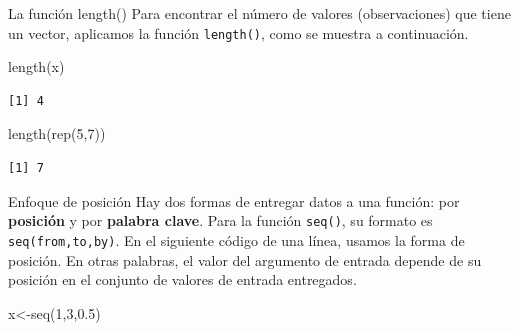 \documentclass[
  ignorenonframetext,
  aspectratio=169,
  spanish,
]{beamer}
\newenvironment{Shaded}{\begin{snugshade}}{\end{snugshade}}
\newcommand{\DecValTok}[1]{\textcolor[rgb]{0.68,0.00,0.00}{#1}}
\newcommand{\FloatTok}[1]{\textcolor[rgb]{0.68,0.00,0.00}{#1}}
\newcommand{\FunctionTok}[1]{\textcolor[rgb]{0.28,0.35,0.67}{#1}}
\newcommand{\NormalTok}[1]{\textcolor[rgb]{0.00,0.23,0.31}{#1}}
\newcommand{\OtherTok}[1]{\textcolor[rgb]{0.00,0.23,0.31}{#1}}
\begin{document}
\begin{frame}[fragile]{La función length()}
\label{la-funciuxf3n-length}
Para encontrar el número de valores (observaciones) que tiene un vector,
aplicamos la función \texttt{length()}, como se muestra a continuación.

\begin{Shaded}
\begin{Highlighting}[]
\FunctionTok{length}\NormalTok{(x)}
\end{Highlighting}
\end{Shaded}

\begin{verbatim}
[1] 4
\end{verbatim}

\begin{Shaded}
\begin{Highlighting}[]
\FunctionTok{length}\NormalTok{(}\FunctionTok{rep}\NormalTok{(}\DecValTok{5}\NormalTok{,}\DecValTok{7}\NormalTok{))}
\end{Highlighting}
\end{Shaded}

\begin{verbatim}
[1] 7
\end{verbatim}
\end{frame}

\begin{frame}[fragile]{Enfoque de posición}
\label{enfoque-de-posiciuxf3n}
Hay dos formas de entregar datos a una función: por \textbf{posición} y
por \textbf{palabra clave}. Para la función \texttt{seq()}, su formato
es \texttt{seq(from,to,by)}. En el siguiente código de una línea, usamos
la forma de posición. En otras palabras, el valor del argumento de
entrada depende de su posición en el conjunto de valores de entrada
entregados.

\begin{Shaded}
\begin{Highlighting}[]
\NormalTok{x}\OtherTok{\textless{}{-}}\FunctionTok{seq}\NormalTok{(}\DecValTok{1}\NormalTok{,}\DecValTok{3}\NormalTok{,}\FloatTok{0.5}\NormalTok{)}
\end{Highlighting}
\end{Shaded}
\end{frame}
\end{document}

